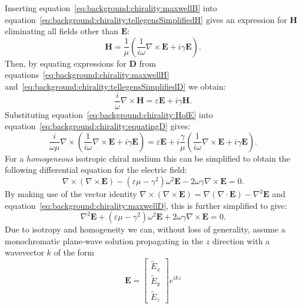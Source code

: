 Inserting equation~\ref{eq:background:chirality:maxwellB} into equation~\ref{eq:background:chirality:tellegensSimplifiedH} gives an expression for $\mathbf{H}$ eliminating all fields other than $\mathbf{E}$:
\begin{equation}\label{eq:background:chirality:HofE}
    \mathbf{H} = \frac{1}{\mu} \left( \frac{1}{i \omega} \nabla \times \mathbf{E} + i \gamma \mathbf{E} \right).
\end{equation}
Then, by equating expressions for $\mathbf{D}$ from equations~\ref{eq:background:chirality:maxwellH} and~\ref{eq:background:chirality:tellegensSimplifiedD} we obtain:
\begin{equation}\label{eq:background:chirality:equatingD}
    \frac{i}{\omega} \nabla \times \mathbf{H} = \varepsilon \mathbf{E} + i \gamma \mathbf{H}.
\end{equation}
Substituting equation~\ref{eq:background:chirality:HofE} into equation~\ref{eq:background:chirality:equatingD} gives:
\begin{equation}\label{eq:background:chirality:diffEfull}
    \frac{i}{\omega \mu} \nabla \times \left( \frac{1}{i \omega} \nabla \times \mathbf{E} + i \gamma \mathbf{E} \right) = \varepsilon \mathbf{E} + i \frac{\gamma}{\mu} \left( \frac{1}{i \omega} \nabla \times \mathbf{E} + i \gamma \mathbf{E} \right).
\end{equation}
For a \textit{homogeneous} isotropic chiral medium this can be simplified to obtain the following differential equation for the electric field:
\begin{equation}\label{eq:background:chirality:diffEreduced}
    \nabla \times (\nabla \times \mathbf{E}) - (\varepsilon \mu - \gamma^2)\omega^2 \mathbf{E} - 2 \omega \gamma \nabla \times \mathbf{E} = 0.
\end{equation}
By making use of the vector identity $\nabla \times (\nabla \times \mathbf{E}) = \nabla(\nabla \cdot \mathbf{E}) - \nabla^2 \mathbf{E}$ and equation~\ref{eq:background:chirality:maxwellD}, this is further simplified to give:
\begin{equation}\label{eq:background:chirality:diffE}
    \nabla^2 \mathbf{E} + (\varepsilon \mu - \gamma^2)\omega^2 \mathbf{E} + 2 \omega \gamma \nabla \times \mathbf{E} = 0.
\end{equation}
Due to isotropy and homogeneity we can, without loss of generality, assume a monochromatic plane-wave solution propagating in the $z$ direction with a wavevector $k$ of the form
\begin{equation}
    \mathbf{E} = \begin{bmatrix}
        \tilde E_x \\
        \tilde E_y \\
        \tilde E_z
      \end{bmatrix} e^{i k z}
\end{equation}
